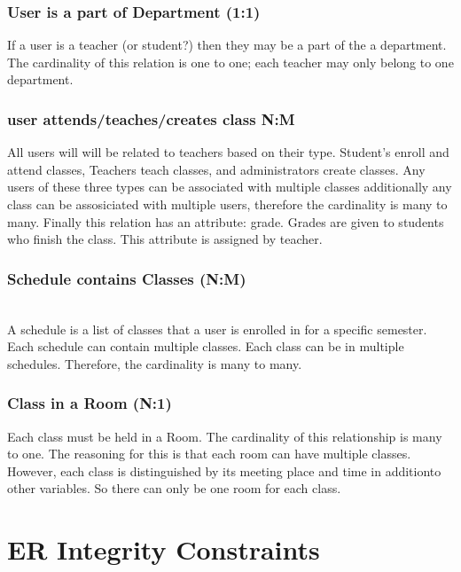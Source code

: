 \documentclass[11pt,oneside,a4paper]{article}
\begin{document}
\subsubsection{User is a part of Department (1:1)}
If a user is a teacher (or student?) then they may be a part of the a department.
 The cardinality of this relation is one to one; each teacher may only belong to 
one department.
\subsubsection{user attends/teaches/creates class N:M}
All users will will be related to teachers based on their type.  Student's enroll and 
attend classes, Teachers teach classes, and administrators create classes.  Any users 
of these three types can be associated with multiple classes additionally any class 
can be assosiciated with multiple users, therefore the cardinality is many to many. 
Finally this relation has an attribute: grade.  Grades are given to students who 
finish the class. This attribute is assigned by teacher.
\subsubsection{Schedule contains Classes (N:M)}
\\
A schedule is a list of classes that a user is enrolled in for a specific semester.  Each schedule can contain multiple classes.  Each class can be in multiple schedules. Therefore, the cardinality is many to many. 
\subsubsection{Class in a Room (N:1)}
Each class must be held in a Room.  The cardinality of this relationship is many to one.  The reasoning for this is that each room can have multiple classes. However, each class is distinguished by its meeting place and time in additionto other variables.  So there can only be one room for each class. 
\section{ER Integrity Constraints}
\end{document}
